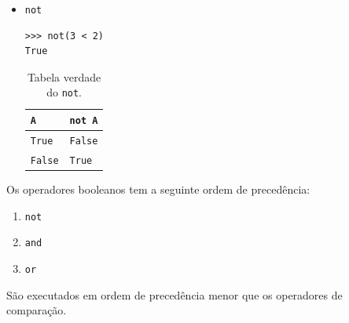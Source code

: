 \begin{itemize}
\item \lstinline+not+ 

\begin{lstlisting}[xrightmargin=2.5em]
>>> not(3 < 2)
True
\end{lstlisting}

  \begin{table}[H]
    \centering
    \caption{Tabela verdade do \lstinline+not+.}
    \begin{tabular}{l|l}
      {\lstinline+A+}     & {\lstinline+not A+} \\\hline
      {\lstinline+True+}  & {\lstinline+False+} \\
      {\lstinline+False+} & {\lstinline+True+} \\\hline
    \end{tabular}
  \end{table}  
\end{itemize}

\begin{obs}
  Os operadores booleanos tem a seguinte ordem de precedência:
  \begin{enumerate}[1.]
  \item \lstinline+not+
  \item \lstinline+and+
  \item \lstinline+or+
  \end{enumerate}
  São executados em ordem de precedência menor que os operadores de comparação.
\end{obs}

